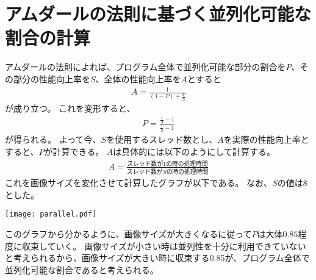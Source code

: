 \documentclass[11pt, oneside]{article}   	%
\begin{document}
\section{アムダールの法則に基づく並列化可能な割合の計算}
アムダールの法則によれば、プログラム全体で並列化可能な部分の割合を$P$、その部分の性能向上率を$S$、全体の性能向上率を$A$とすると
\begin{align*}
	A = \frac{1}{(1 - P) + \frac{P}{S}}
\end{align*}
が成り立つ。
これを変形すると、
\begin{align*}
	P = \frac{\frac{1}{A} - 1}{\frac{1}{S} - 1}
\end{align*}
が得られる。
よって今、$S$を使用するスレッド数とし、$A$を実際の性能向上率とすると、$P$が計算できる。
$A$は具体的には以下のようにして計算する。
\begin{align*}
	A = \frac{\text{スレッド数が$1$の時の処理時間}}{\text{スレッド数が$S$の時の処理時間}}
\end{align*}
これを画像サイズを変化させて計算したグラフが以下である。
なお、$S$の値は8とした。
\begin{center}
\texttt{[image: parallel.pdf]}
\end{center}
このグラフから分かるように、画像サイズが大きくなるに従って$P$は大体$0.85$程度に収束していく。
画像サイズが小さい時は並列性を十分に利用できていないと考えられるから、画像サイズが大きい時に収束する0.85が、プログラム全体で並列化可能な割合であると考えられる。
\end{document}
